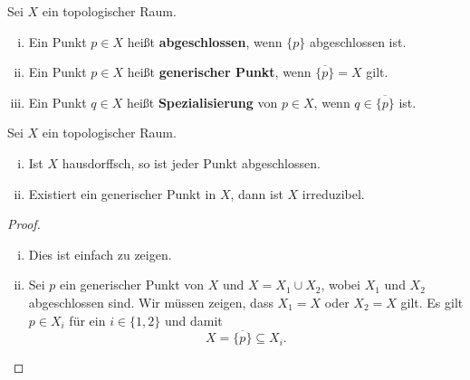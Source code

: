 \begin{defn}
	Sei $X$ ein topologischer Raum.
	\begin{enumerate}[i)]
		\item Ein Punkt $p \in X$ heißt \textbf{abgeschlossen}, wenn $\{p\}$ abgeschlossen ist.
		\item Ein Punkt $p \in X$ heißt \textbf{generischer Punkt}, wenn $\overline{\{p\}} = X$ gilt.
		\item Ein Punkt $q \in X$ heißt \textbf{Spezialisierung} von $p \in X$, wenn $q \in \overline{\{p\}}$ ist.
	\end{enumerate}
\end{defn}

\begin{lem}
\label{lem:4.6}
	Sei $X$ ein topologischer Raum.
	\begin{enumerate}[i)]
		\item Ist $X$ hausdorffsch, so ist jeder Punkt abgeschlossen.
		\item Existiert ein generischer Punkt in $X$, dann ist $X$ irreduzibel.
	\end{enumerate}
	\begin{proof}
		\begin{enumerate}[i)]
			\item Dies ist einfach zu zeigen.
			\item Sei $p$ ein generischer Punkt von $X$ und $X = X_1 \cup X_2$, wobei $X_1$ und $X_2$ abgeschlossen sind. Wir müssen zeigen, dass $X_1=X$ oder $X_2=X$ gilt. Es gilt $p \in X_i$ für ein $i \in \{1,2\}$ und damit
			\[
				X = \overline{\{p\}} \subseteq X_i.
			\]
		\end{enumerate}
	\end{proof}
\end{lem}

